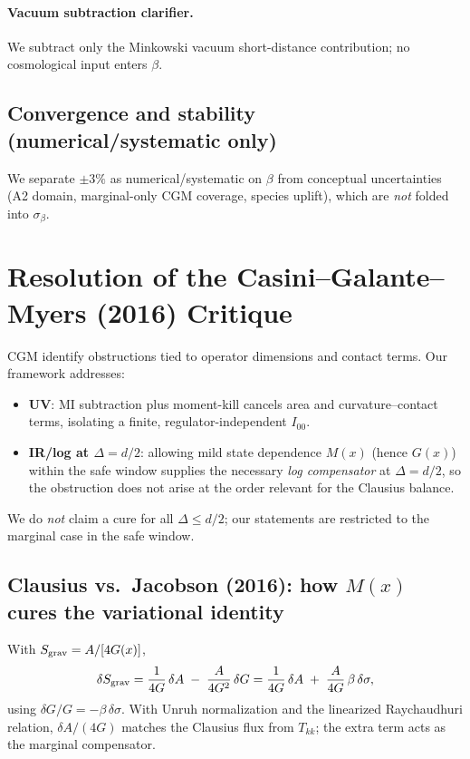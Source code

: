 \documentclass[aps,prd,onecolumn,superscriptaddress,nofootinbib]{revtex4-2}
\begin{document}
\paragraph*{Vacuum subtraction clarifier.}
We subtract only the Minkowski vacuum short-distance contribution; no cosmological input enters \(\beta\).

\subsection{Convergence and stability (numerical/systematic only)}
\label{sec:convergence}
We separate \(\pm3\%\) as numerical/systematic on \(\beta\) from conceptual uncertainties (A2 domain, marginal-only CGM coverage, species uplift), which are \emph{not} folded into \(\sigma_\beta\).

\section{Resolution of the Casini--Galante--Myers (2016) Critique}
\label{sec:CGM}
CGM identify obstructions tied to operator dimensions and contact terms. Our framework addresses:
\begin{itemize}[leftmargin=1.3em]
\item \textbf{UV}: MI subtraction plus moment-kill cancels area and curvature–contact terms, isolating a finite, regulator-independent \(I_{00}\).
\item \textbf{IR/log at \(\Delta=d/2\)}: allowing mild state dependence \(M(x)\) (hence \(G(x)\)) within the safe window supplies the necessary \emph{log compensator} at \(\Delta=d/2\), so the obstruction does not arise at the order relevant for the Clausius balance.
\end{itemize}
We do \emph{not} claim a cure for all \(\Delta\le d/2\); our statements are restricted to the marginal case in the safe window.

\subsection{Clausius vs.\ Jacobson (2016): how \texorpdfstring{$M(x)$}{M(x)} cures the variational identity}
\label{sec:clausius-vs-jacobson}
With \(S_{\rm grav}=A/[4G(x)]\),
\begin{equation}
\delta S_{\rm grav}
= \frac{1}{4G}\,\delta A \;-\; \frac{A}{4G^2}\,\delta G
= \frac{1}{4G}\,\delta A \;+\; \frac{A}{4G}\,\beta\,\delta\sigma,
\label{eq:deltaSgrav-runningG}
\end{equation}
using \(\delta G/G=-\beta\,\delta\sigma\). With Unruh normalization and the linearized Raychaudhuri relation, \(\delta A/(4G)\) matches the Clausius flux from \(T_{kk}\); the extra term acts as the marginal compensator.
\end{document}
